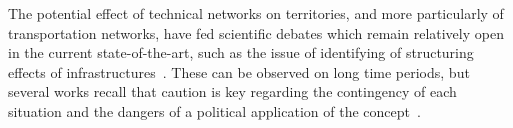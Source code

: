 \documentclass[11pt]{article}
\begin{document}
The potential effect of technical networks on territories, and more particularly of transportation networks, have fed scientific debates which remain relatively open in the current state-of-the-art, such as the issue of identifying of structuring effects of infrastructures~\citep{offner1993effets}. These can be observed on long time periods, but several works recall that caution is key regarding the contingency of each situation and the dangers of a political application of the concept~\citep{espacegeo2014effets}.
\end{document}
